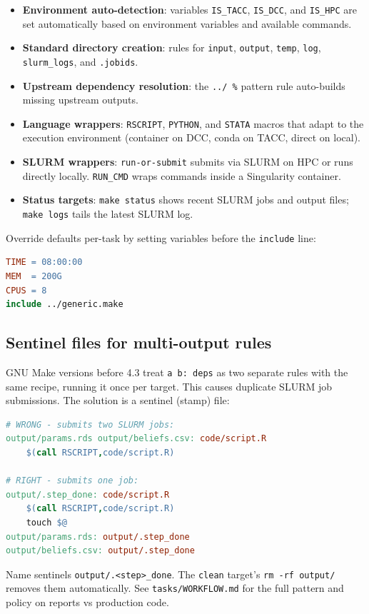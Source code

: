 \begin{itemize}
	\item \textbf{Environment auto-detection}: variables \texttt{IS\_TACC}, \texttt{IS\_DCC}, and \texttt{IS\_HPC} are set automatically based on environment variables and available commands.
	\item \textbf{Standard directory creation}: rules for \texttt{input}, \texttt{output}, \texttt{temp}, \texttt{log}, \texttt{slurm\_logs}, and \texttt{.jobids}.
	\item \textbf{Upstream dependency resolution}: the \texttt{../ \%} pattern rule auto-builds missing upstream outputs.
	\item \textbf{Language wrappers}: \texttt{RSCRIPT}, \texttt{PYTHON}, and \texttt{STATA} macros that adapt to the execution environment (container on DCC, conda on TACC, direct on local).
	\item \textbf{SLURM wrappers}: \texttt{run-or-submit} submits via SLURM on HPC or runs directly locally. \texttt{RUN\_CMD} wraps commands inside a Singularity container.
	\item \textbf{Status targets}: \texttt{make status} shows recent SLURM jobs and output files; \texttt{make logs} tails the latest SLURM log.
\end{itemize}

Override defaults per-task by setting variables before the \texttt{include} line:
\begin{lstlisting}[language=make]
TIME = 08:00:00
MEM  = 200G
CPUS = 8
include ../generic.make
\end{lstlisting}

\subsection{Sentinel files for multi-output rules}

GNU Make versions before 4.3 treat \texttt{a b: deps} as two separate rules
with the same recipe, running it once per target.
This causes duplicate SLURM job submissions.
The solution is a sentinel (stamp) file:

\begin{lstlisting}[language=make]
# WRONG - submits two SLURM jobs:
output/params.rds output/beliefs.csv: code/script.R
	$(call RSCRIPT,code/script.R)

# RIGHT - submits one job:
output/.step_done: code/script.R
	$(call RSCRIPT,code/script.R)
	touch $@
output/params.rds: output/.step_done
output/beliefs.csv: output/.step_done
\end{lstlisting}

Name sentinels \texttt{output/.<step>\_done}.
The \texttt{clean} target's \texttt{rm -rf output/} removes them automatically.
See \texttt{tasks/WORKFLOW.md} for the full pattern and policy on reports vs production code.
